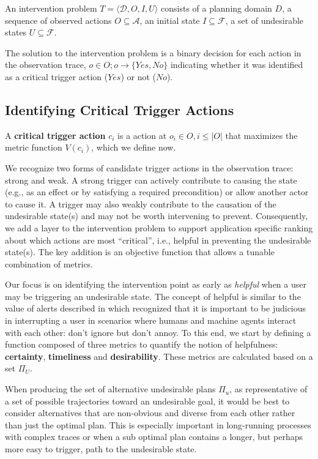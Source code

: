 \begin{definition}
An intervention problem $T = \langle \mathcal{D}, O, I, U \rangle$ consists of a planning domain $D$, a sequence of observed actions  $O \subseteq \mathcal{A}$, an initial state $I \subseteq \mathcal{F}$, a set of undesirable states $U\subseteq \mathcal{F}$.
\end{definition}
The solution to the intervention problem is a binary decision for each action in the observation trace, $o \in O;  o \rightarrow \lbrace Yes, No \rbrace$ indicating whether it was identified as a critical trigger action ($Yes$) or not ($No$).


\subsection{Identifying Critical Trigger Actions}
A \textbf{critical trigger action} $c_i$ is a  action at $o_i \in O, i\leq |O|$ that maximizes the metric function $V (c_i)$, which we define now.

We recognize two forms of candidate trigger actions in the observation trace: strong and weak. A strong trigger can actively contribute to causing the state (e.g., as an effect or by satisfying a required precondition) or allow another actor to cause it. A trigger may also weakly contribute to the causation of the undesirable state(s) and may not be worth intervening to prevent. Consequently, we add a layer to the intervention problem to support application specific ranking about which actions are most ``critical'', i.e., helpful in preventing the undesirable state(s). The key addition is an objective function that allows a tunable combination of metrics.

Our focus is on identifying the intervention point as early as  \textit{helpful} when a user may be triggering an undesirable state. The concept of helpful is similar to the value of alerts described in \cite{Wilkins2003} which recognized that it is important to be judicious in interrupting a user in scenarios where humans and machine agents interact with each other: don't ignore but don't annoy. To this end, we start by defining a function composed of three  metrics to quantify the notion of helpfulness: \textbf{certainty}, \textbf{timeliness} and \textbf{desirability}. These metrics are calculated based on a set $\Pi_U$.


When producing the set of alternative undesirable plans $\Pi_u$, as representative of a set of possible trajectories toward an undesirable goal, it would be best to consider alternatives that are non-obvious and diverse from each other rather than just the optimal plan.  This is especially important in long-running processes with complex traces or when a sub optimal plan contains a longer, but perhaps more easy to trigger, path to the undesirable state.

